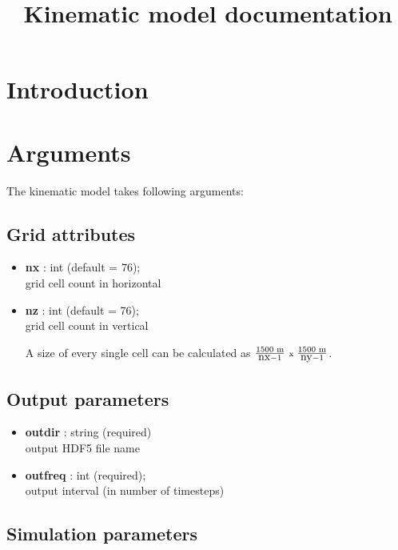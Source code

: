 \documentclass[11pt]{article}
\title{Kinematic model documentation}
\begin{document}
\maketitle

\section{Introduction}

\section{Arguments}

The kinematic model takes following arguments:

\subsection{Grid attributes}

\begin{itemize}
\item \textbf{nx} : int (default = 76);\\ grid cell count in horizontal
\item \textbf{nz} : int (default = 76);\\ grid cell count in vertical

A size of every single cell can be calculated as $\frac{1500\mbox{\scriptsize{ m}}}{\mbox{nx}-1}\mbox{ \scriptsize{x} }\frac{1500\mbox{\scriptsize{ m}}}{\mbox{ny}-1}$.
\end{itemize}

\subsection{Output parameters}

\begin{itemize}
  \item \textbf{outdir} : string (required) \\ output HDF5 file name
  \item \textbf{outfreq} : int (required); \\ output interval (in number of timesteps)
\end{itemize}

\subsection{Simulation parameters}
\end{document}
